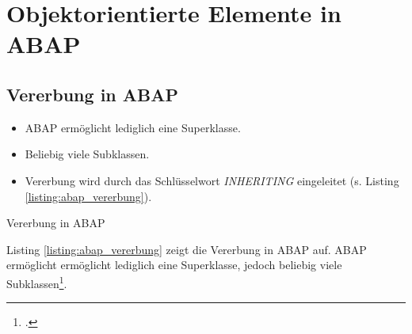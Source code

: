 \section{Objektorientierte Elemente in ABAP}

\subsection{Vererbung in ABAP}
\begin{itemize}
  \item ABAP ermöglicht lediglich eine Superklasse.
  \item Beliebig viele Subklassen. 
  \item Vererbung wird durch das Schlüsselwort 
  \textit{INHERITING} eingeleitet (s. Listing \ref{listing:abap_vererbung}).
\end{itemize}
\begin{listing}[ht]{}
  \caption{Vererbung in ABAP}
  \label{listing:abap_vererbung}
\end{listing}
Listing \ref{listing:abap_vererbung} zeigt die Vererbung in ABAP auf. ABAP ermöglicht ermöglicht lediglich eine Superklasse, jedoch beliebig viele Subklassen\footcite[Vgl.][S. 266 ff.]{kellerABAPObjectsIntroduction2002}.